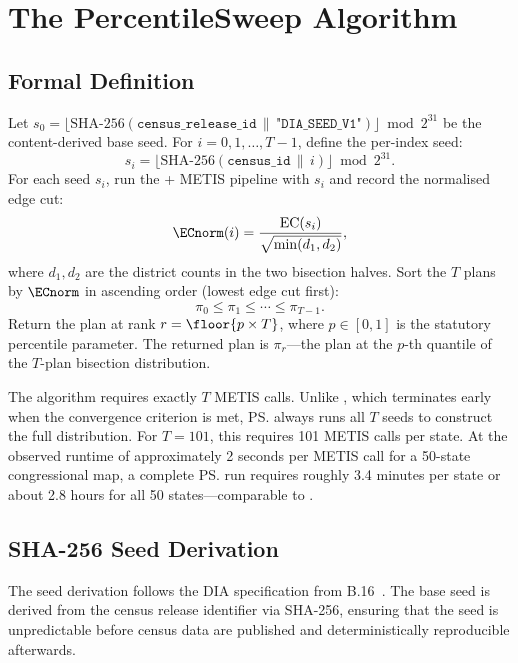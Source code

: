 \section{The PercentileSweep Algorithm}
\label{sec:algorithm}

\subsection{Formal Definition}

\begin{definition}[\ps{}$(p, T)$]
\label{def:percentile-sweep}
Let $s_0 = \lfloor \text{SHA-256}(\texttt{census\_release\_id} \,\|\,
\texttt{"DIA\_SEED\_V1"}) \rfloor \bmod 2^{31}$ be the content-derived base seed.
For $i = 0, 1, \ldots, T-1$, define the per-index seed:
\[
  s_i = \lfloor \text{SHA-256}(\texttt{census\_id} \,\|\, i) \rfloor \bmod 2^{31}.
\]
For each seed $s_i$, run the \ar{} + METIS pipeline with $s_i$ and record
the normalised edge cut:
\[
  \ECnorm(i) = \frac{\mathrm{EC}(s_i)}{\sqrt{\min(d_1, d_2)}},
\]
where $d_1, d_2$ are the district counts in the two bisection halves.
Sort the $T$ plans by $\ECnorm$ in ascending order (lowest edge cut first):
\[
  \pi_0 \leq \pi_1 \leq \cdots \leq \pi_{T-1}.
\]
Return the plan at rank $r = \floor{p \times T}$, where $p \in [0, 1]$
is the statutory percentile parameter.
The returned plan is $\pi_r$---the plan at the $p$-th quantile of the
$T$-plan bisection distribution.
\end{definition}

The algorithm requires exactly $T$ METIS calls.
Unlike \cs{}, which terminates early when the convergence criterion is
met, \ps{} always runs all $T$ seeds to construct the full distribution.
For $T = 101$, this requires 101 METIS calls per state.
At the observed runtime of approximately 2 seconds per METIS call for
a 50-state congressional map, a complete \ps{} run requires roughly 3.4
minutes per state or about 2.8 hours for all 50 states---comparable to
\cs{}.

\subsection{SHA-256 Seed Derivation}

The seed derivation follows the DIA specification from B.16~\citep{b16paper}.
The base seed is derived from the census release identifier via SHA-256,
ensuring that the seed is unpredictable before census data are published
and deterministically reproducible afterwards.

